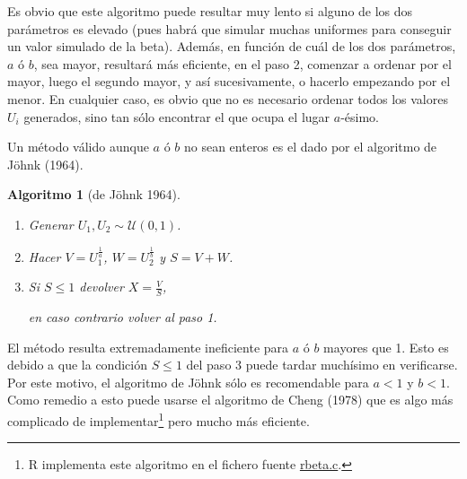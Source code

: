 \documentclass[
]{book}
\theoremstyle{break}
\newtheorem{conjecture}{Algoritmo}[chapter]
\theoremstyle{nonumberplain}
\begin{document}
Es obvio que este algoritmo puede resultar muy lento si alguno de los dos parámetros es elevado (pues habrá que simular muchas uniformes para conseguir un valor simulado de la beta).
Además, en función de cuál de los dos parámetros, \(a\) ó \(b\), sea mayor, resultará más eficiente, en el paso 2, comenzar a ordenar por el mayor, luego el segundo mayor, y así sucesivamente, o hacerlo empezando por el menor.
En cualquier caso, es obvio que no es necesario ordenar todos los valores \(U_{i}\) generados, sino tan sólo encontrar el que ocupa el lugar \(a\)-ésimo.

Un método válido aunque \(a\) ó \(b\) no sean enteros es el dado por el
algoritmo de Jöhnk (1964).

\begin{conjecture}[de Jöhnk 1964]
\protect\hypertarget{cnj:johnk}{}\label{cnj:johnk}

\begin{enumerate}
\def\labelenumi{\arabic{enumi}.}
\item
  Generar \(U_1, U_2\sim \mathcal{U}(0, 1)\).
\item
  Hacer \(V = U_1^{\frac1a}\), \(W = U_2^{\frac1b}\) y \(S = V+W\).
\item
  Si \(S \leq 1\) devolver \(X = \frac VS\),

  en caso contrario volver al paso 1.
\end{enumerate}

\end{conjecture}

El método resulta extremadamente ineficiente para \(a\) ó \(b\) mayores que 1.
Esto es debido a que la condición \(S\leq1\) del paso 3 puede tardar muchísimo en verificarse.
Por este motivo, el algoritmo de Jöhnk sólo es recomendable para \(a<1\) y \(b<1\).
Como remedio a esto puede usarse el algoritmo de Cheng (1978) que es algo más complicado de implementar\footnote{R implementa este algoritmo en el fichero fuente \href{https://svn.r-project.org/R/trunk/src/nmath/rbeta.c}{rbeta.c}.} pero mucho más eficiente.
\end{document}
